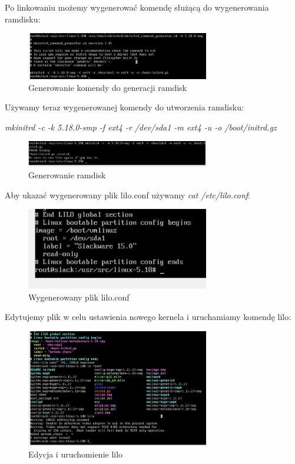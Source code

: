 \documentclass[12pt]{article}
\begin{document}
Po linkowaniu możemy wygenerować komendę służącą do wygenerowania ramdisku:

\begin{figure}[H]
\centering
\includegraphics[width=8cm]{genramdisk.jpg}
\caption{Generowanie komendy do generacji ramdisk}
\end{figure}

Używamy teraz wygenerowanej komendy do utworzenia ramdisku:

\centering\textit{mkinitrd -c -k 5.18.0-smp -f ext4 -r /dev/sda1 -m ext4 -u -o /boot/initrd.gz}

\begin{figure}[H]
\centering
\includegraphics[width=8cm]{generateramdiskwtf.jpg}
\caption{Generowanie ramdisk}
\end{figure}

Aby ukazać wygenerowany plik lilo.conf używamy \textit{cat /etc/lilo.conf}:

\begin{figure}[H]
\centering
\includegraphics[width=8cm]{lilowtf.jpg}
\caption{Wygenerowany plik lilo.conf}
\end{figure}

Edytujemy plik w celu ustawienia nowego kernela i uruchamiamy komendę lilo:

\begin{figure}[H]
\centering
\includegraphics[width=8cm]{liloafter.jpg}
\caption{Edycja i uruchomienie lilo}
\end{figure}
\end{document}
